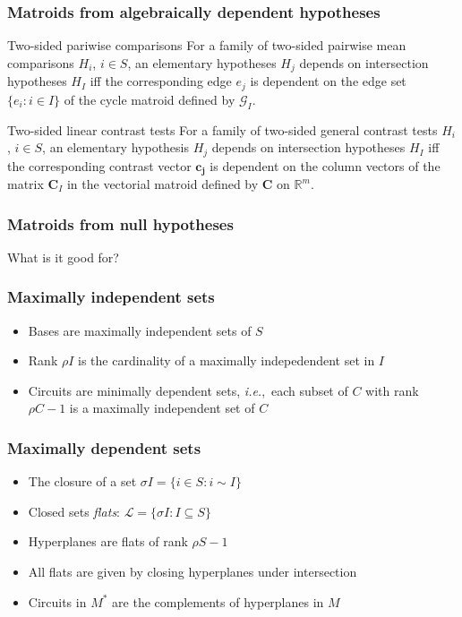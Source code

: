 \documentclass[bigger]{beamer}
\newcommand{\bs}[1]{\bm{#1}}
\newcommand{\ie}{{\sl i.e.},~}
\begin{document}
\begin{frame}
\frametitle{Matroids from algebraically dependent hypotheses}

 \begin{block}{Two-sided pariwise comparisons}
   For a family of two-sided pairwise mean comparisons $H_i$, $i \in
   S$, an elementary hypotheses $H_j$ depends on intersection
   hypotheses $H_I$ iff the corresponding edge $e_j$ is dependent on
   the edge set $\{e_i:i \in I\}$ of the cycle matroid defined by
   $\mathscr{G}_I$.
 \end{block}

 \begin{block}{Two-sided linear contrast tests}
   For a family of two-sided general contrast tests $H_i$, $i \in S$,
   an elementary hypothesis $H_j$ depends on intersection hypotheses
   $H_I$ iff the corresponding contrast vector $\bs{c_j}$ is
   dependent on the column vectors of the matrix $\bs{C}_I$ in the
   vectorial matroid defined by $\bs{C}$ on $\mathbb{R}^m$.
 \end{block}

\end{frame}


\begin{frame}
 \frametitle{Matroids from null hypotheses}
 {\Large What is it good for?\\
 }
\end{frame}

\begin{frame}
\frametitle{Maximally independent sets}
 \begin{itemize}
 \item Bases are maximally independent sets of $S$
 \item Rank $\rho I$ is the cardinality of a maximally indepedendent set in $I$
 \item Circuits are minimally dependent sets, \ie each subset of $C$
   with rank $\rho C - 1$ is a maximally independent set of $C$
 \end{itemize}
\end{frame}



\begin{frame}
\frametitle{Maximally dependent sets}
\begin{itemize}
\item The closure of a set $\sigma I = \{i \in S: i \sim I\}$
\item Closed sets {\em flats}: $\mathscr{L} = \{\sigma I: I \subseteq S\}$
\item Hyperplanes are flats of rank $\rho S - 1$
\item All flats are given by closing hyperplanes under intersection
\item Circuits in $M^*$ are the complements of hyperplanes in $M$
\end{itemize} %
\end{frame}
\end{document}
